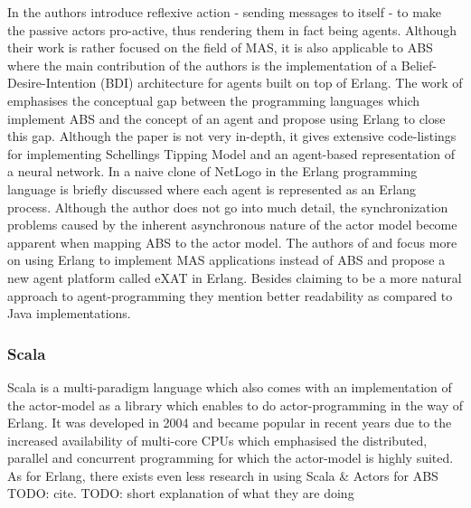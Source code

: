 In \cite{varela_modelling_2004} the authors introduce reflexive action - sending messages to itself - to make the passive actors pro-active, thus rendering them in fact being agents. Although their work is rather focused on the field of MAS, it is also applicable to ABS where the main contribution of the authors is the implementation of a Belief-Desire-Intention (BDI) architecture for agents built on top of Erlang. 
The work of \cite{sher_agent-based_2013} emphasises the conceptual gap between the programming languages which implement ABS and the concept of an agent and propose using Erlang to close this gap. Although the paper is not very in-depth, it gives extensive code-listings for implementing Schellings Tipping Model and an agent-based representation of a neural network.
In \cite{bezirgiannis_improving_2013} a naive clone of NetLogo in the Erlang programming language is briefly discussed where each agent is represented as an Erlang process. Although the author does not go into much detail, the synchronization problems caused by the inherent asynchronous nature of the actor model become apparent when mapping ABS to the actor model.
The authors of \cite{di_stefano_using_2005} and \cite{di_stefano_exat:_2007} focus more on using Erlang to implement MAS applications instead of ABS and propose a new agent platform called eXAT in Erlang. Besides claiming to be a more natural approach to agent-programming they mention better readability as compared to Java implementations.

\subsubsection{Scala}
Scala is a multi-paradigm language which also comes with an implementation of the actor-model as a library which enables to do actor-programming in the way of Erlang. It was developed in 2004 and became popular in recent years due to the increased availability of multi-core CPUs which emphasised the distributed, parallel and concurrent programming for which the actor-model is highly suited.
As for Erlang, there exists even less research in using Scala \& Actors for ABS TODO: cite.  TODO: short explanation of what they are doing